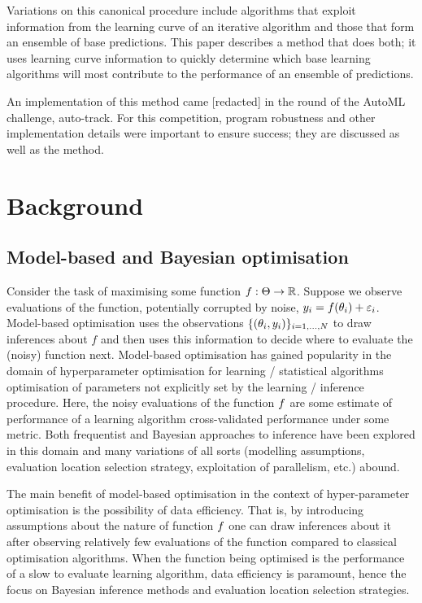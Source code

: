 \documentclass{article} %
\begin{document}
Variations on this canonical procedure include algorithms that exploit information from the learning curve of an iterative algorithm and those that form an ensemble\footnotemark{} of base predictions.
This paper describes a method that does both; it uses learning curve information to quickly determine which base learning algorithms will most contribute to the performance of an ensemble of predictions.


An implementation of this method came [redacted] in the  round of the AutoML challenge, auto-track.
For this competition, program robustness and other implementation details were important to ensure success; they are discussed as well as the method.

\section{Background}

\subsection{Model-based and Bayesian optimisation}

Consider the task of maximising some function $f : \Theta \to \mathbb{R}$.
Suppose we observe evaluations of the function, potentially corrupted by noise, $y_i = f(\theta_i) + \varepsilon_i$.
Model-based optimisation uses the observations $\{(\theta_i, y_i)\}_{i=1,\dots,N}$ to draw inferences about $f$ and then uses this information to decide where to evaluate the (noisy) function next.
Model-based optimisation has gained popularity in the domain of hyperparameter optimisation for learning / statistical algorithms \ie optimisation of parameters not explicitly set by the learning / inference procedure.
Here, the noisy evaluations of the function $f$ are some estimate of performance of a learning algorithm \eg cross-validated performance under some metric.
Both frequentist and Bayesian approaches to inference have been explored in this domain and many variations of all sorts (modelling assumptions, evaluation location selection strategy, exploitation of parallelism, etc.) abound.

The main benefit of model-based optimisation in the context of hyper-parameter optimisation is the possibility of data efficiency.
That is, by introducing assumptions about the nature of function $f$ one can draw inferences about it after observing relatively few evaluations of the function compared to classical optimisation algorithms\footnotemark{}.
When the function being optimised is the performance of a slow to evaluate learning algorithm, data efficiency is paramount, hence the focus on Bayesian inference methods and evaluation location selection strategies.
\end{document}
